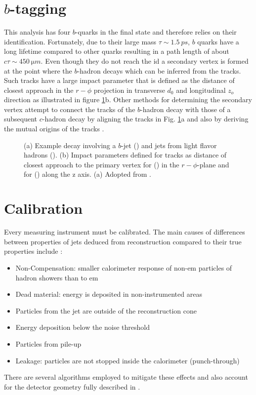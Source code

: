 \section{$b$-tagging}\label{sec:b_tagging}
This analysis has four $b$-quarks in the final state and therefore relies on their identification.  Fortunately, due to their large mass $\tau\sim\qty{1.5}{ps}$, $b$ quarks have a long lifetime compared to other quarks resulting in a path length of about $c\tau\sim\qty{450}{\micro m}$. Even though they do not reach the \ac{id} a secondary vertex is formed at the point where the $b$-hadron decays which can be inferred from the tracks. Such tracks have a large impact parameter that is defined as the distance of closest approach in the $r-\phi$ projection in transverse $d_0$ and longitudinal $z_o$ direction \citep{aad2008atlas} as illustrated in figure \ref{fig:secondary_vertex}b. Other methods for determining the secondary vertex attempt to connect the tracks of the $b$-hadron decay with those of a subsequent $c$-hadron decay by aligning the tracks in Fig. \ref{fig:secondary_vertex}a and also by deriving the mutual origins of the tracks \citep{ATL-PHYS-PUB-2017-013}.

\begin{figure}[]
  \centering
  \caption{(a) Example decay involving a $b$-jet () and jets from light flavor hadrons (). (b) Impact parameters defined for tracks as distance of closest approach to the primary vertex for (\mbox{\color[HTML]{009245}{$d_0$}}) in the $r-\phi$-plane and for (\mbox{\color[HTML]{EC1C25}{$z_0$}}) along the z axis. (a) Adopted from \cite{Guth:2765038}.}
  \label{fig:secondary_vertex}
\end{figure}

\section{Calibration}
Every measuring instrument must be calibrated. The main causes of differences between properties of jets deduced from reconstruction compared to their true properties include \citep{atlas2011jet}:
\begin{itemize}
  \item Non-Compensation: smaller calorimeter response of non-\ac{em} particles of hadron showers than to \ac{em}
  \item Dead material: energy is deposited in non-instrumented areas
  \item Particles from the jet are outside of the reconstruction cone
  \item Energy deposition below the noise threshold
  \item Particles from pile-up
  \item Leakage: particles are not stopped inside the calorimeter (punch-through)
\end{itemize}
There are several algorithms employed to mitigate these effects and also account for the detector geometry fully described in \citep{atlas2021jet}.

